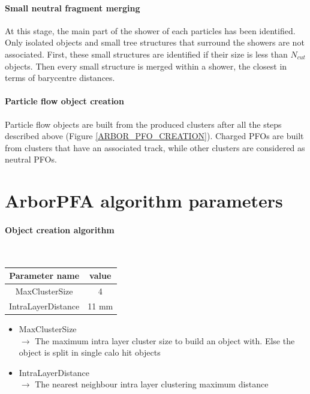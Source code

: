 \documentclass[12pt]{article}
\begin{document}
\paragraph*{Small neutral fragment merging} At this stage, the main part of the shower of each particles has been identified. Only isolated objects and small tree structures that surround the showers are not associated. First, these small structures are identified if their size is less than $N_{cut}$ objects. Then every small structure is merged within a shower, the closest in terms of barycentre distances.

\paragraph*{Particle flow object creation} Particle flow objects are built from the produced clusters after all the steps described above (Figure \ref{ARBOR_PFO_CREATION}). Charged PFOs are built from clusters that have an associated track, while other clusters are considered as neutral PFOs.

\newpage
\section{ArborPFA algorithm parameters}
\label{ARBOR_ALGORITHM_PARAMETERS}

\paragraph{Object creation algorithm} ~

\begin{table}[!h]
  \begin{center}
    \begin{tabu} to \linewidth { c | c } 
          Parameter name & value \\
          \hline
          MaxClusterSize & 4 \\
          IntraLayerDistance & 11 mm
    \end{tabu} 
  \end{center}
\end{table}

\begin{itemize}
 \item MaxClusterSize \\
 $\rightarrow$ The maximum intra layer cluster size to build an object with. Else the object is split in single calo hit objects
 \item IntraLayerDistance \\
 $\rightarrow$ The nearest neighbour intra layer clustering maximum distance
\end{itemize}
\end{document}

